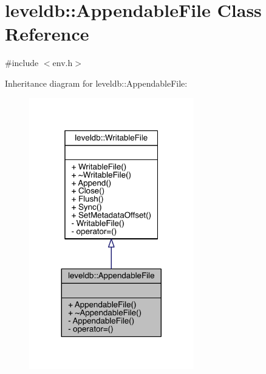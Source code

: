 \hypertarget{classleveldb_1_1_appendable_file}{}\section{leveldb\+:\+:Appendable\+File Class Reference}
\label{classleveldb_1_1_appendable_file}


{\ttfamily \#include $<$env.\+h$>$}



Inheritance diagram for leveldb\+:\+:Appendable\+File\+:\nopagebreak
\begin{figure}[H]
\begin{center}
\leavevmode
\includegraphics[width=203pt]{classleveldb_1_1_appendable_file__inherit__graph}
\end{center}
\end{figure}


